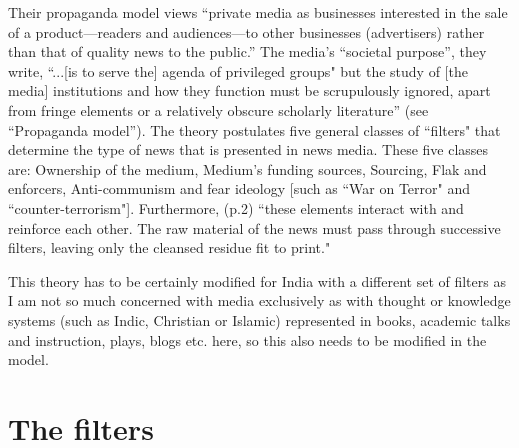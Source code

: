 Their propaganda model views “private media as businesses interested in the sale of a product—readers and audiences—to other businesses (advertisers) rather than that of quality news to the public.” The media's “societal purpose”, they write, “...[is to serve the] agenda of privileged groups" but the study of [the media] institutions and how they function must be scrupulously ignored, apart from fringe elements or a relatively obscure scholarly literature” (see “Propaganda model”). The theory postulates five general classes of ``filters" that determine the type of news that is presented in news media. These five classes are: Ownership of the medium, Medium’s funding sources, Sourcing, Flak and enforcers, Anti-communism and fear ideology [such as ``War on Terror" and ``counter-terrorism"]. Furthermore, (p.2) ``these elements interact with and reinforce each other. The raw material of the news must pass through successive filters, leaving only the cleansed residue fit to print."
\vskip 2pt

This theory has to be certainly modified for India with a different set of filters as I am not so much concerned with media exclusively as with thought or knowledge systems (such as Indic, Christian or Islamic) represented in books, academic talks and instruction, plays, blogs etc. here, so this also needs to be modified in the model.

\section*{The filters}

